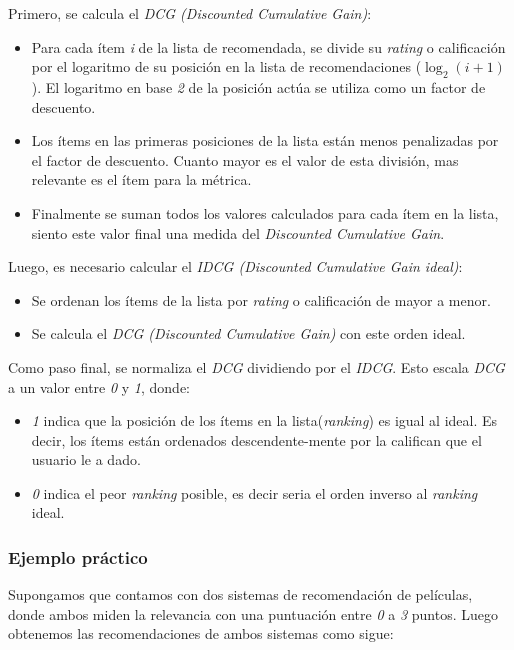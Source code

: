 \documentclass[11pt,a4paper,twoside]{thesis}
\begin{document}
Primero, se calcula el \textit{DCG (Discounted Cumulative Gain)}:

\begin{itemize}
	\item Para cada ítem \textit{i} de la lista de recomendada, se divide su \textit{rating} o calificación por el logaritmo de su posición en la lista de recomendaciones ($\log_2(i + 1)$). El logaritmo en base \textit{2} de la posición actúa se utiliza como un factor de descuento.
	\item Los ítems en las primeras posiciones de la lista están menos penalizadas por el factor de descuento. Cuanto mayor es el valor de esta división, mas relevante es el ítem para la métrica.
	\item Finalmente se suman todos los valores calculados para cada ítem en la lista, siento este valor final una medida del \textit{Discounted Cumulative Gain}.
\end{itemize}

Luego, es necesario calcular el \textit{IDCG (\textit{Discounted Cumulative Gain} ideal)}:

\begin{itemize}
	\item Se ordenan los ítems de la lista por \textit{rating} o calificación de mayor a menor.
	\item Se calcula el \textit{DCG (Discounted Cumulative Gain)} con este orden ideal.
\end{itemize}

Como paso final, se normaliza el \textit{DCG} dividiendo por el \textit{IDCG}. Esto escala \textit{DCG} a un valor entre \textit{0} y \textit{1}, donde:

\begin{itemize}
	\item \textit{1} indica que la posición de los ítems en la lista(\textit{ranking}) es igual al ideal. Es decir, los ítems están ordenados descendente-mente por la califican que el usuario le a dado.
	\item \textit{0} indica el peor \textit{ranking} posible, es decir seria el orden inverso al \textit{ranking} ideal.
\end{itemize}

\subsubsection{Ejemplo práctico}

Supongamos que contamos con dos sistemas de recomendación de películas, donde ambos miden la relevancia con una puntuación entre \textit{0} a \textit{3} puntos. Luego obtenemos las recomendaciones de ambos sistemas como sigue:
\end{document}
